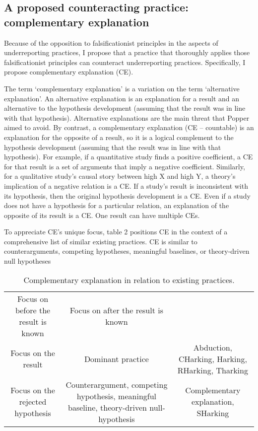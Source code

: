 \documentclass[empirical, authordate, meta]{jote-new-article}
\begin{document}
\subsection{A proposed counteracting practice: complementary explanation}

Because of the opposition to falsificationist principles in the aspects of underreporting practices, I propose that a practice that thoroughly applies those falsificationist principles can counteract underreporting practices. Specifically, I propose complementary explanation (CE). 

The term ‘complementary explanation' is a variation on the term ‘alternative explanation'. An alternative explanation is an explanation for a result and an alternative to the hypothesis development (assuming that the result was in line with that hypothesis). Alternative explanations are the main threat that Popper aimed to avoid. By contrast, a complementary explanation (CE -- countable) is an explanation for the opposite of a result, so it is a logical complement to the hypothesis development (assuming that the result was in line with that hypothesis). For example, if a quantitative study finds a positive coefficient, a CE for that result is a set of arguments that imply a negative coefficient. Similarly, for a qualitative study's causal story between high X and high Y, a theory's implication of a negative relation is a CE. If a study's result is inconsistent with its hypothesis, then the original hypothesis development is a CE. Even if a study does not have a hypothesis for a particular relation, an explanation of the opposite of its result is a CE. One result can have multiple CEs.

To appreciate CE's unique focus, table 2 positions CE in the context of a comprehensive list of similar existing practices. CE is similar to counterarguments, competing hypotheses, meaningful baselines, or theory-driven null hypotheses \parencite[][e,.,g,.]{Schwab2012}





\begin{table}

    \caption{Complementary explanation in relation to existing practices.
    }
    \label{tab:2}
  
\begin{tabular}{c  c  c}

  Focus on before the result is known & Focus on after the result is known\\
Focus on the result & Dominant practice & Abduction, CHarking, Harking, RHarking, Tharking\\
Focus on the rejected hypothesis  & Counterargument, competing hypothesis, meaningful baseline, theory-driven null-hypothesis & Complementary explanation, SHarking\\

\end{tabular}


\end{table}
\end{document}
